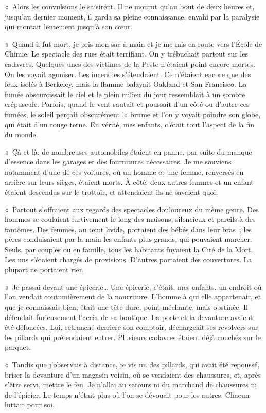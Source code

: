 \documentclass[french,twoside]{book} %
\begin{document}
« Alors les convulsions le saisirent. Il ne mourut qu’au bout de deux heures et, jusqu’au dernier moment, il garda sa pleine connaissance, envahi par la paralysie qui montait lentement jusqu’à son cœur.\par
« Quand il fut mort, je pris mon sac à main et je me mis en route vers l’École de Chimie. Le spectacle des rues était terrifiant. On y trébuchait partout sur les cadavres. Quelques-unes des victimes de la Peste n’étaient point encore mortes. On les voyait agoniser. Les incendies s’étendaient. Ce n’étaient encore que des feux isolés à Berkeley, mais la flamme balayait Oakland et San Francisco. La fumée obscurcissait le ciel et le plein milieu du jour ressemblait à un sombre crépuscule. Parfois, quand le vent sautait et poussait d’un côté ou d’autre ces fumées, le soleil perçait obscurément la brume et l’on y voyait poindre son globe, qui était d’un rouge terne. En vérité, mes enfants, c’était tout l’aspect de la fin du monde.\par
« Çà et là, de nombreuses automobiles étaient en panne, par suite du manque d’essence dans les garages et des fournitures nécessaires. Je me souviens notamment d’une de ces voitures, où un homme et une femme, renversés en arrière sur leurs sièges, étaient morts. À côté, deux autres femmes et un enfant étaient descendus sur le trottoir, et attendaient ils ne savaient quoi.\par
« Partout s’offraient aux regards des spectacles douloureux du même genre. Des hommes se coulaient furtivement le long des maisons, silencieux et pareils à des fantômes. Des femmes, au teint livide, portaient des bébés dans leur bras ; les pères conduisaient par la main les enfants plus grands, qui pouvaient marcher. Seuls, par couples ou en famille, tous les habitants fuyaient la Cité de la Mort. Les uns s’étaient chargés de provisions. D’autres portaient des couvertures. La plupart ne portaient rien.\par
« Je passai devant une épicerie… Une épicerie, c’était, mes enfants, un endroit où l’on vendait coutumièrement de la nourriture. L’homme à qui elle appartenait, et que je connaissais bien, était une tête dure, point méchante, mais obstinée. Il défendait furieusement l’accès de sa boutique. La porte et la devanture avaient été défoncées. Lui, retranché derrière son comptoir, déchargeait ses revolvers sur les pillards qui prétendaient entrer. Plusieurs cadavres étaient déjà couchés sur le parquet.\par
« Tandis que j’observais à distance, je vis un des pillards, qui avait été repoussé, briser la devanture d’un magasin voisin, où se vendaient des chaussures, et, après s’être servi, mettre le feu. Je n’allai au secours ni du marchand de chaussures ni de l’épicier. Le temps n’était plus où l’on se dévouait pour les autres. Chacun luttait pour soi.\par
\end{document}
